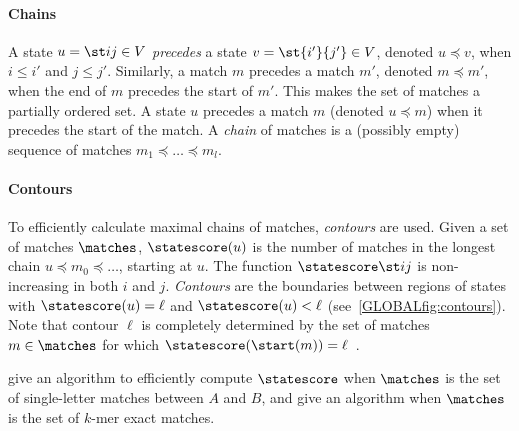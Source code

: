 \paragraph{Chains}
A state $u=\st ij\in V$ \emph{precedes} a state $v=\st {i'}{j'}\in V$, denoted
$u\preceq v$, when $i\leq i'$ and $j\leq j'$. Similarly, a match $m$ precedes a
match $m'$, denoted $m\preceq m'$, when the end of $m$ precedes the start of
$m'$. This makes the set of matches a partially ordered set.
A state $u$ precedes a match $m$ (denoted $u\preceq m$) when it precedes
the start of the match. A \emph{chain} of matches is a (possibly empty) sequence
of matches $m_1 \preceq \dots \preceq m_l$.

\paragraph{Contours}
To efficiently calculate maximal chains of matches, \emph{contours} are used.
Given a set of matches $\matches$, $\statescore(u)$ is the number of matches in
the longest chain $u\preceq m_0 \preceq \dots$, starting at $u$. The function
$\statescore\st ij$ is non-increasing in both $i$ and $j$. \emph{Contours} are
the boundaries between regions of states with $\statescore(u) = \ell$ and
$\statescore(u)<\ell$ (see~\cref{GLOBALfig:contours}). Note that contour $\ell$ is
completely determined by the set of matches $m\in \matches$ for which
${\statescore(\start(m)) = \ell}$~\citep{hirschberg1977algorithms}.

\citet{hunt1977fast} give an algorithm to efficiently compute $\statescore$ when
$\matches$ is the set of single-letter matches between $A$ and $B$, and
\citet{deorowicz2014efficient} give an algorithm when $\matches$ is the set of
$k$-mer exact matches.

